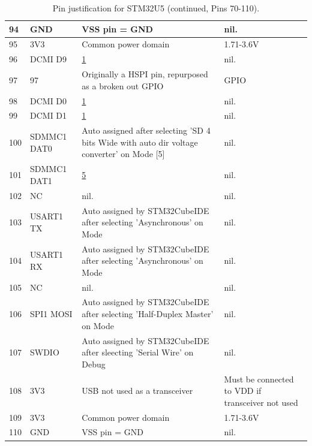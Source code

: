 \begin{table}[H]
\begin{tabular}{|l|p{3cm}|p{6.5cm}|p{3.5cm}|}
        94 & GND & VSS pin = GND & nil. \\ \hline
        95 & 3V3 & Common power domain & 1.71-3.6V \\ \hline
        96 & DCMI D9 & \hyperlink{dcmi-reason}{1} & nil. \\ \hline
        97 & 97 & Originally a HSPI pin, repurposed as a broken out GPIO & GPIO \\ \hline
        98 & DCMI D0 & \hyperlink{dcmi-reason}{1} & nil. \\ \hline
        99 & DCMI D1 & \hyperlink{dcmi-reason}{1} & nil. \\ \hline
        100 & SDMMC1 DAT0 & Auto assigned after selecting 'SD 4 bits Wide with auto dir voltage converter' on Mode \hypertarget{sdmmc1}{[5]} & nil. \\ \hline
        101 & SDMMC1 DAT1 & \hyperlink{sdmmc1}{5} & nil. \\ \hline
        102 & NC & nil. & nil. \\ \hline
        103 & USART1 TX & Auto assigned by STM32CubeIDE after selecting 'Asynchronous' on Mode & nil. \\ \hline
        104 & USART1 RX & Auto assigned by STM32CubeIDE after selecting 'Asynchronous' on Mode & nil. \\ \hline
        105 & NC & nil. & nil. \\ \hline
        106 & SPI1 MOSI & Auto assigned by STM32CubeIDE after selecting 'Half-Duplex Master' on Mode & nil. \\ \hline
        107 & SWDIO & Auto assigned by STM32CubeIDE after sleecting 'Serial Wire' on Debug & nil. \\ \hline
        108 & 3V3 & USB not used as a transceiver & Must be connected to VDD if transceiver not used \\ \hline
        109 & 3V3 & Common power domain & 1.71-3.6V \\ \hline
        110 & GND & VSS pin = GND & nil. \\ \hline
    \end{tabular}
    \caption{Pin justification for STM32U5 (continued, Pins 70-110).}
\end{table}

